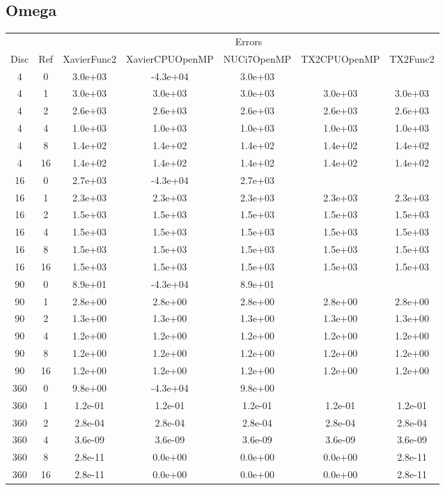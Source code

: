 \subsection{Omega}
\begin{center}
\begin{tabular}{c|c|c|c|c|c|c}
	&&\multicolumn{5}{c}{Errors}\\
	Disc&Ref&XavierFunc2&XavierCPUOpenMP&NUCi7OpenMP&TX2CPUOpenMP&TX2Func2\\
\hline
4&0&3.0e+03&-4.3e+04&3.0e+03\\
4&1&3.0e+03&3.0e+03&3.0e+03&3.0e+03&3.0e+03\\
4&2&2.6e+03&2.6e+03&2.6e+03&2.6e+03&2.6e+03\\
4&4&1.0e+03&1.0e+03&1.0e+03&1.0e+03&1.0e+03\\
4&8&1.4e+02&1.4e+02&1.4e+02&1.4e+02&1.4e+02\\
4&16&1.4e+02&1.4e+02&1.4e+02&1.4e+02&1.4e+02\\
\hline
16&0&2.7e+03&-4.3e+04&2.7e+03\\
16&1&2.3e+03&2.3e+03&2.3e+03&2.3e+03&2.3e+03\\
16&2&1.5e+03&1.5e+03&1.5e+03&1.5e+03&1.5e+03\\
16&4&1.5e+03&1.5e+03&1.5e+03&1.5e+03&1.5e+03\\
16&8&1.5e+03&1.5e+03&1.5e+03&1.5e+03&1.5e+03\\
16&16&1.5e+03&1.5e+03&1.5e+03&1.5e+03&1.5e+03\\
\hline
90&0&8.9e+01&-4.3e+04&8.9e+01\\
90&1&2.8e+00&2.8e+00&2.8e+00&2.8e+00&2.8e+00\\
90&2&1.3e+00&1.3e+00&1.3e+00&1.3e+00&1.3e+00\\
90&4&1.2e+00&1.2e+00&1.2e+00&1.2e+00&1.2e+00\\
90&8&1.2e+00&1.2e+00&1.2e+00&1.2e+00&1.2e+00\\
90&16&1.2e+00&1.2e+00&1.2e+00&1.2e+00&1.2e+00\\
\hline
360&0&9.8e+00&-4.3e+04&9.8e+00\\
360&1&1.2e-01&1.2e-01&1.2e-01&1.2e-01&1.2e-01\\
360&2&2.8e-04&2.8e-04&2.8e-04&2.8e-04&2.8e-04\\
360&4&3.6e-09&3.6e-09&3.6e-09&3.6e-09&3.6e-09\\
360&8&2.8e-11&0.0e+00&0.0e+00&0.0e+00&2.8e-11\\
360&16&2.8e-11&0.0e+00&0.0e+00&0.0e+00&2.8e-11\\
\hline
\end{tabular}
\end{center}








